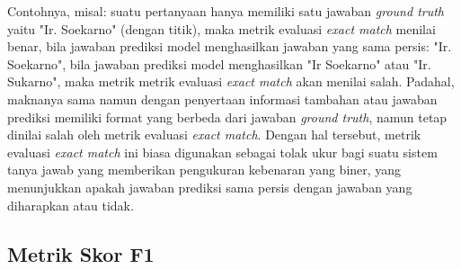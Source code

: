 Contohnya, misal: suatu pertanyaan hanya memiliki satu jawaban \emph{ground truth} yaitu "Ir. Soekarno" (dengan titik), maka metrik evaluasi \emph{exact match} menilai benar, bila jawaban prediksi model menghasilkan jawaban yang sama persis: "Ir. Soekarno", bila jawaban prediksi model menghasilkan "Ir Soekarno" atau "Ir. Sukarno", maka metrik metrik evaluasi \emph{exact match} akan menilai salah. Padahal, maknanya sama namun dengan penyertaan informasi tambahan atau jawaban prediksi memiliki format yang berbeda dari jawaban \emph{ground truth}, namun tetap dinilai salah oleh metrik evaluasi \emph{exact match}. Dengan hal tersebut, metrik evaluasi \emph{exact match} ini biasa digunakan sebagai tolak ukur bagi suatu sistem tanya jawab yang memberikan pengukuran kebenaran yang biner, yang menunjukkan apakah jawaban prediksi sama persis dengan jawaban yang diharapkan atau tidak.

\subsection{Metrik Skor F1}
\label{2.8.2}

